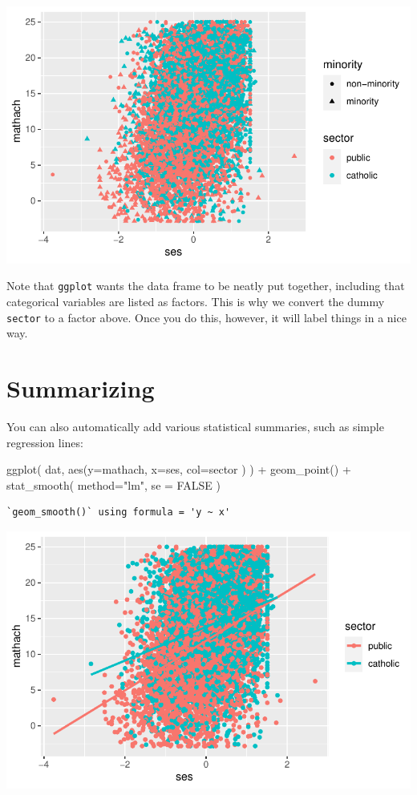 \documentclass[
  letterpaper,
  DIV=11,
  numbers=noendperiod]{scrreprt}
\newenvironment{Shaded}{}{}
\newcommand{\AttributeTok}[1]{\textcolor[rgb]{0.49,0.56,0.16}{#1}}
\newcommand{\ConstantTok}[1]{\textcolor[rgb]{0.53,0.00,0.00}{#1}}
\newcommand{\FunctionTok}[1]{\textcolor[rgb]{0.02,0.16,0.49}{#1}}
\newcommand{\NormalTok}[1]{#1}
\newcommand{\SpecialCharTok}[1]{\textcolor[rgb]{0.25,0.44,0.63}{#1}}
\newcommand{\StringTok}[1]{\textcolor[rgb]{0.25,0.44,0.63}{#1}}
\begin{document}
\includegraphics{intro_ggplot_files/figure-pdf/unnamed-chunk-3-1.pdf}

Note that \texttt{ggplot} wants the data frame to be neatly put
together, including that categorical variables are listed as factors.
This is why we convert the dummy \texttt{sector} to a factor above. Once
you do this, however, it will label things in a nice way.

\section{Summarizing}\label{summarizing}

You can also automatically add various statistical summaries, such as
simple regression lines:

\begin{Shaded}
\begin{Highlighting}[]
\FunctionTok{ggplot}\NormalTok{( dat, }\FunctionTok{aes}\NormalTok{(}\AttributeTok{y=}\NormalTok{mathach, }\AttributeTok{x=}\NormalTok{ses, }\AttributeTok{col=}\NormalTok{sector ) ) }\SpecialCharTok{+} 
    \FunctionTok{geom\_point}\NormalTok{() }\SpecialCharTok{+} 
    \FunctionTok{stat\_smooth}\NormalTok{( }\AttributeTok{method=}\StringTok{"lm"}\NormalTok{, }\AttributeTok{se =} \ConstantTok{FALSE}\NormalTok{ )}
\end{Highlighting}
\end{Shaded}

\begin{verbatim}
`geom_smooth()` using formula = 'y ~ x'
\end{verbatim}

\includegraphics{intro_ggplot_files/figure-pdf/unnamed-chunk-4-1.pdf}
\end{document}
